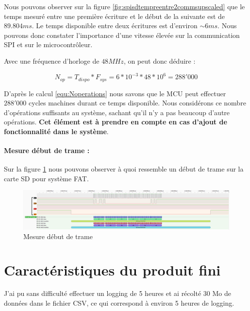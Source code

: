 {	Nous pouvons observer sur la figure \ref{fig:spisdtempreentre2commsupscaled} que le temps mesuré entre une première écriture et le début de la suivante est de $89.804 ms$. Le temps disponible entre deux écritures est d'environ $\sim6ms$.
	Nous pouvons donc constater l'importance d'une vitesse élevée sur la communication SPI et sur le microcontrôleur.
	
	Avec une fréquence d'horloge de $48MHz$, on peut donc déduire :
	
	\begin{equation} 
		\label{equ:Noperations}
		N_{op} = T_{dispo} * F_{sys} = 6*10^{-3} * 48*10^{6} = 288'000 
	\end{equation}
	
	D'après le calcul \ref{equ:Noperations} nous savons que le MCU peut effectuer $288'000$ cycles machines durant ce temps disponible. Nous considérons ce nombre d'opérations suffisants au système, sachant qu'il n'y a pas beaucoup d'autre opérations. \textbf{Cet élément est à prendre en compte en cas d'ajout de fonctionnalité dans le système}.
	
	\paragraph{Mesure début de trame :} Sur la figure \ref{fig:spisdtramedepartupscaled} nous pouvons observer à quoi ressemble un début de trame sur la carte SD pour système FAT.
	
	\begin{figure}[h]
		\centering
		\includegraphics[width=1\linewidth]{Mesures/SPI_SD_Trame_Depart_Upscaled}
		\caption{Mesure début de trame}
		\label{fig:spisdtramedepartupscaled}
	\end{figure}
	
	
	
}

\clearpage

\section{Caractéristiques du produit fini}

J'ai pu sans difficulté effectuer un logging de 5 heures et ai récolté 30 Mo de données dans le fichier CSV, ce qui correspond à environ 5 heures de logging.